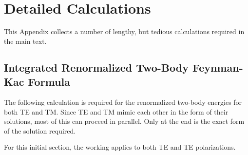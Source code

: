 \chapter{Detailed Calculations}
\label{app:nasty_calc}
This Appendix collects a number of lengthy, but tedious calculations required in the main text.  

\section{Integrated Renormalized Two-Body Feynman-Kac Formula}

The following calculation is required for the renormalized two-body energies for both TE and 
TM.  Since TE and TM mimic each other in the form of their solutions, most of this can proceed in 
parallel.  Only at the end is the exact form of the solution required.

For this initial section, the working applies to both TE and TE polarizations. 

